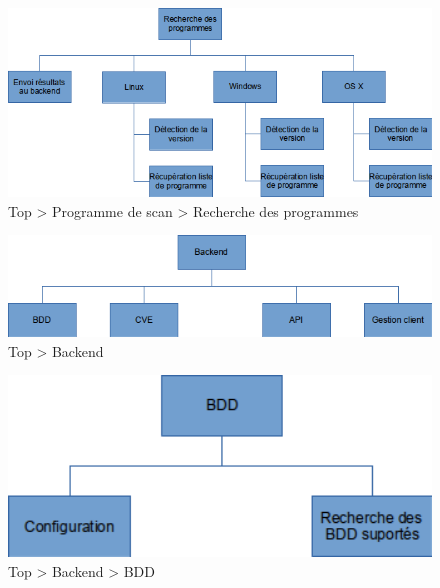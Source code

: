 \begin{figure}[H]
  \vspace*{2cm}
  \caption{Top \textgreater{} Programme de scan \textgreater{} Recherche des programmes}
  \centering
  \vspace*{0.5cm}
  \includegraphics[max width=18cm]{wbs3_scan_recherche.png}
\end{figure}

\begin{figure}[H]
  \vspace*{2cm}
  \caption{Top \textgreater{} Backend}
  \centering
  \vspace*{0.5cm}
  \includegraphics[max width=18cm]{wbs3_backend_top.png}
\end{figure}

\begin{figure}[H]
  \vspace*{2cm}
  \caption{Top \textgreater{} Backend \textgreater{} BDD}
  \centering
  \vspace*{0.5cm}
  \includegraphics[max width=18cm]{wbs3_backend_bdd.png}
\end{figure}

